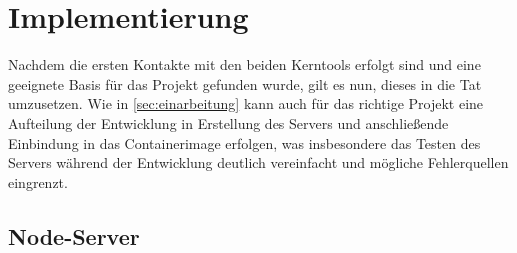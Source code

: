 \chapter{Implementierung}
Nachdem die ersten Kontakte mit den beiden Kerntools erfolgt sind und eine geeignete Basis für das Projekt gefunden wurde, gilt es nun, dieses in die Tat umzusetzen.
Wie in \autoref{sec:einarbeitung} kann auch für das richtige Projekt eine Aufteilung der Entwicklung in Erstellung des Servers und anschließende Einbindung in das Containerimage erfolgen, was insbesondere das Testen des Servers während der Entwicklung deutlich vereinfacht und mögliche Fehlerquellen eingrenzt.

\section{Node-Server}
